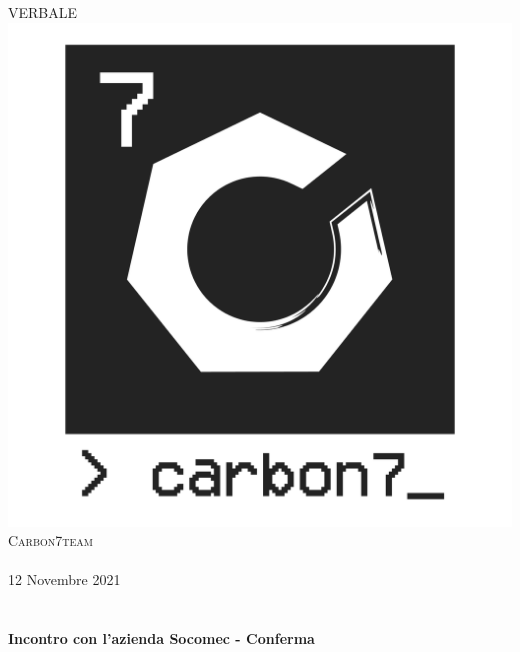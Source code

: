 \begin{center}
    \textsc{\huge VERBALE}\\[0.75cm] 
    \includegraphics[scale=0.25]{res/images/carbon7_small_logo-07.png}\\[1cm]
    \textsc{\Large Carbon7team}\\[0.3cm]
    \\[0.5cm]
    {\large 12 Novembre 2021}\\[0.5cm]
    \\[0.5cm]

    \HRule \\[0.4cm]
    {\huge \bfseries Incontro con l'azienda Socomec - Conferma}\\[0.2cm]
    \HRule \\[1.5cm]


\end{center}
